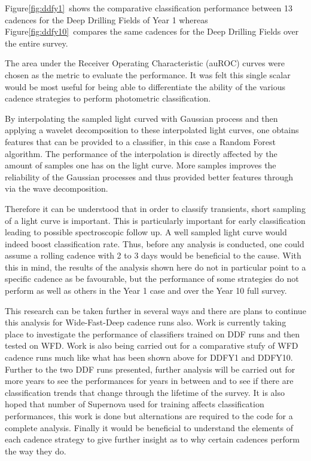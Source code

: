 Figure\ref{fig:ddfy1}~shows the comparative classification performance between 13 cadences for the Deep
Drilling Fields of Year 1 whereas Figure\ref{fig:ddfy10}~compares the same
cadences for the Deep Drilling Fields over the entire survey.

The area under the Receiver Operating Characteristic (auROC) curves were chosen as the metric
to evaluate the performance. It was felt this single scalar would be most useful
for being able to differentiate the ability of the various cadence strategies
to perform photometric classification.



By interpolating the sampled light curved with Gaussian process and then applying a
wavelet decomposition to these interpolated light curves, one obtains features
that can be provided to a classifier, in this case a Random Forest algorithm.
The performance of the interpolation is directly affected by the amount of
samples one has on the light curve. More samples improves the reliability of the
Gaussian processes and thus provided better features through via the wave decomposition.

Therefore it can be understood that in order to classify transients, short sampling of a light
curve is important. This is particularly important for early classification
leading to possible spectroscopic follow up. A well sampled light curve would
indeed boost classification rate. Thus, before any analysis is conducted, one
could assume a rolling cadence with 2 to 3 days would be beneficial to the
cause.
With this in mind, the results of the analysis shown here do not in particular
point to a specific cadence as be favourable, but the performance of some
strategies do not perform as well as others in the Year 1 case and over the
Year 10 full survey.


This research can be taken further in several ways and there are plans to
continue this analysis for Wide-Fast-Deep cadence runs also. Work is currently
taking place to investigate the performance of classifiers trained on DDF runs
and then tested on WFD. Work is also being carried out for a comparative stufy
of WFD cadence runs much like what has been shown above for DDFY1 and DDFY10.
Further to the two DDF runs presented, further analysis will be carried out for
more years to see the performances for years in between and to see if there
are classification trends that change through the lifetime of the survey. It is
also hoped that number of Supernova used for training affects classification
performances, this work is done but alternations are required to the code for a complete
analysis. Finally it would be beneficial to understand the elements of each cadence
strategy to give further insight as to why certain cadences perform the way they do.

